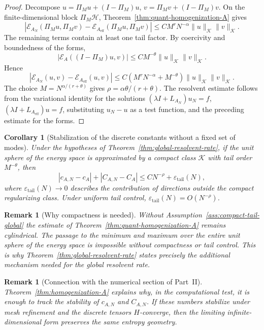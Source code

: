 \documentclass{article}
\newtheorem{corollary}[theorem]{Corollary}
\newtheorem{remark}[theorem]{Remark}
\begin{document}
\begin{proof}
Decompose \(u=\Pi_Mu+(I-\Pi_M)u\), \(v=\Pi_Mv+(I-\Pi_M)v\). On the
finite-dimensional block \(\Pi_M\mathcal H\), Theorem~\ref{thm:quant-homogenization-A} gives
\[
        |\mathcal E_{A_N}(\Pi_Mu,\Pi_Mv)-\mathcal E_{A_{\mathrm{eff}}}(\Pi_Mu,\Pi_Mv)|\le C M^r N^{-\alpha}\|u\|_{\mathcal K}\|v\|_{\mathcal K}.
\]
The remaining terms contain at least one tail factor. By coercivity and
boundedness of the forms,
\[
        |\mathcal E_A((I-\Pi_M)u,v)|\le C M^{-\theta}\|u\|_{\mathcal K}\|v\|_{\mathcal K}.
\]
Hence
\[
        |\mathcal E_{A_N}(u,v)-\mathcal E_{A_{\mathrm{eff}}}(u,v)|\le C(M^rN^{-\alpha}+M^{-\theta})\|u\|_{\mathcal K}\|v\|_{\mathcal K}.
\]
The choice \(M=N^{\alpha/(r+\theta)}\) gives \(\rho=\alpha\theta/(r+\theta)\).
The resolvent estimate follows from the variational identity for the solutions
\((\lambda I+L_{A_N})u_N=f\), \((\lambda I+L_{A_{\mathrm{eff}}})u=f\),
substituting \(u_N-u\) as a test function, and the preceding estimate for the
forms.
\end{proof}

\begin{corollary}[Stabilization of the discrete constants without a fixed set of modes]
\label{cor:global-constants-rate}
Under the hypotheses of Theorem~\ref{thm:global-resolvent-rate}, if the unit
sphere of the energy space is approximated by a compact class \(\mathcal K\)
with tail order \(M^{-\theta}\), then
\[
        |c_{A,N}-c_A|+|C_{A,N}-C_A|\le C N^{-\rho}+\varepsilon_{\mathrm{tail}}(N),
\]
where \(\varepsilon_{\mathrm{tail}}(N)\to0\) describes the contribution of
directions outside the compact regularizing class. Under uniform tail control,
\(\varepsilon_{\mathrm{tail}}(N)=O(N^{-\rho})\).
\end{corollary}

\begin{remark}[Why compactness is needed]
Without Assumption~\ref{ass:compact-tail-global} the estimate of
Theorem~\ref{thm:quant-homogenization-A} remains cylindrical. The passage to
the minimum and maximum over the entire unit sphere of the energy space is
impossible without compactness or tail control. This is why
Theorem~\ref{thm:global-resolvent-rate} states precisely the additional
mechanism needed for the global resolvent rate.
\end{remark}

\begin{remark}[Connection with the numerical section of Part~II]
Theorem~\ref{thm:homogenization-A} explains why, in the computational test, it
is enough to track the stability of \(c_{A,N}\) and \(C_{A,N}\). If these
numbers stabilize under mesh refinement and the discrete tensors
\(H\)-converge, then the limiting infinite-dimensional form preserves the same
entropy geometry.
\end{remark}
\end{document}

